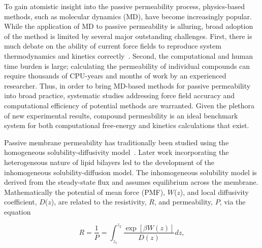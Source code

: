 \par To gain atomistic insight into the passive permeability process, physics-based methods, such as molecular dynamics (MD), have become increasingly popular. While the application of MD to passive permeability is alluring, broad adoption of the method is limited by several major outstanding challenges. First, there is much debate on the ability of current force fields to reproduce system thermodynamics and kinetics correctly~\cite{Paloncyova2014,Wang2015,Vitalini2015}. Second, the computational and human time burden is large; calculating the permeability of individual compounds can require thousands of CPU-years and months of work by an experienced researcher. Thus, in order to bring MD-based methods for passive permeability into broad practice, systematic studies addressing force field accuracy and computational efficiency of potential methods are warranted. Given the plethora of new experimental results, compound permeability is an ideal benchmark system for both computational free-energy and kinetics calculations that exist. 

\par Passive membrane permeability has traditionally been studied using the homogeneous solubility-diffusivity model~\cite{Finkelstein1968}. Later work incorporating the heterogeneous nature of lipid bilayers led to the development of the inhomogeneous solubility-diffusion model\cite{Diamond1974,Marrink1994}. The inhomogeneous solubility model is derived from the steady-state flux and assumes equilibrium across the membrane. Mathematically the potential of mean force (PMF), $W$($z$), and local diffusivity coefficient, $D$($z$), are related to the resistivity, $R$, and permeability, $P$, via the equation
    
\begin{equation}
    R = \frac{1}{P} = \int_{z_1}^{z_2} \frac{\exp[\beta W(z)]}{D(z)}dz,
    \label{eq:solubility-diffusion}
\end{equation}


